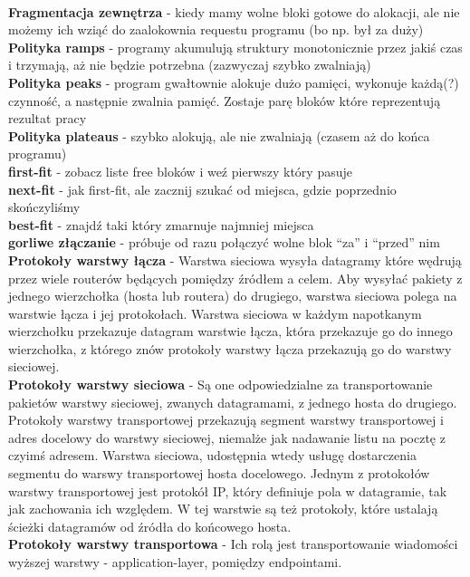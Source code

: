 \documentclass{article}
\begin{document}
\\ \textbf{Fragmentacja zewnętrza} - kiedy mamy wolne bloki gotowe do alokacji, ale nie możemy ich wziąć do zaalokownia requestu programu (bo np. był za duży) 
\\ \textbf{Polityka ramps} - programy akumulują struktury monotonicznie przez jakiś czas i trzymają, aż nie będzie potrzebna (zazwyczaj szybko zwalniają)
\\ \textbf{Polityka peaks} - program gwałtownie alokuje dużo pamięci, wykonuje każdą(?) czynność, a następnie zwalnia pamięć. Zostaje parę bloków które reprezentują rezultat pracy
\\ \textbf{Polityka plateaus} - szybko alokują, ale nie zwalniają (czasem aż do końca programu)
\\ \textbf{first-fit} - zobacz liste free bloków i weź pierwszy który pasuje
\\ \textbf{next-fit} - jak first-fit, ale zacznij szukać od miejsca, gdzie poprzednio skończyliśmy
\\ \textbf{best-fit} - znajdź taki który zmarnuje najmniej miejsca
\\ \textbf{gorliwe złączanie} - próbuje od razu połączyć wolne blok “za” i “przed” nim 
\\ \textbf{Protokoły warstwy łącza} - Warstwa sieciowa wysyła datagramy które wędrują przez wiele routerów będących pomiędzy źródłem a celem. Aby wysyłać pakiety z jednego wierzchołka (hosta lub routera) do drugiego, warstwa sieciowa polega na warstwie łącza i jej protokołach. Warstwa sieciowa w każdym napotkanym wierzchołku przekazuje datagram warstwie łącza, która przekazuje go do innego wierzchołka, z którego znów protokoły warstwy łącza przekazują go do warstwy sieciowej.
\\ \textbf{Protokoły warstwy sieciowa} - Są one odpowiedzialne za transportowanie pakietów warstwy sieciowej, zwanych datagramami, z jednego hosta do drugiego. Protokoły warstwy transportowej
przekazują segment warstwy transportowej i adres docelowy do warstwy sieciowej, niemalże jak nadawanie listu na pocztę z czyimś adresem. Warstwa sieciowa, udostępnia wtedy usługę dostarczenia segmentu do warswy transportowej hosta docelowego.
Jednym z protokołów warstwy transportowej jest protokół IP, który definiuje pola w datagramie, tak jak zachowania ich względem. W tej warstwie są też protokoły, które ustalają ścieżki datagramów
od źródła do końcowego hosta.
\\ \textbf{Protokoły warstwy transportowa} - Ich rolą jest transportowanie wiadomości wyższej warstwy - application-layer, pomiędzy endpointami.
\end{document}
